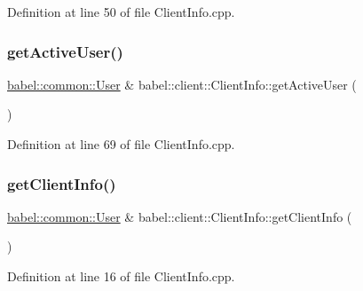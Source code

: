Definition at line 50 of file Client\+Info.\+cpp.

\mbox{\label{classbabel_1_1client_1_1_client_info_ace2f9fbe7d629a1a349195e4cbe437d8}} 
\subsubsection{\texorpdfstring{get\+Active\+User()}{getActiveUser()}}
{\footnotesize\ttfamily \mbox{\hyperlink{classbabel_1_1common_1_1_user}{babel\+::common\+::\+User}} \& babel\+::client\+::\+Client\+Info\+::get\+Active\+User (\begin{DoxyParamCaption}{ }\end{DoxyParamCaption})}



Definition at line 69 of file Client\+Info.\+cpp.

\mbox{\label{classbabel_1_1client_1_1_client_info_a50cd2a1bae911402337b166c55d28770}} 
\subsubsection{\texorpdfstring{get\+Client\+Info()}{getClientInfo()}}
{\footnotesize\ttfamily \mbox{\hyperlink{classbabel_1_1common_1_1_user}{babel\+::common\+::\+User}} \& babel\+::client\+::\+Client\+Info\+::get\+Client\+Info (\begin{DoxyParamCaption}{ }\end{DoxyParamCaption})}



Definition at line 16 of file Client\+Info.\+cpp.

